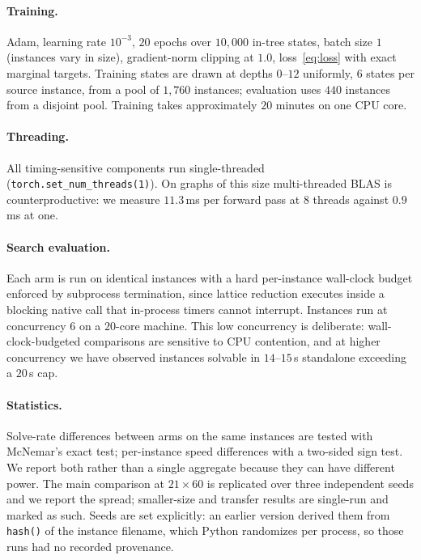 \documentclass[11pt]{article}
\begin{document}
\paragraph{Training.} Adam, learning rate $10^{-3}$, $20$ epochs over $10{,}000$ in-tree states, batch size $1$ (instances vary in size), gradient-norm clipping at $1.0$, loss~\eqref{eq:loss} with exact marginal targets. Training states are drawn at depths $0$--$12$ uniformly, $6$ states per source instance, from a pool of $1{,}760$ instances; evaluation uses $440$ instances from a disjoint pool. Training takes approximately $20$ minutes on one CPU core.

\paragraph{Threading.} All timing-sensitive components run single-threaded (\texttt{torch.set\_num\_threads(1)}). On graphs of this size multi-threaded BLAS is counterproductive: we measure $11.3$\,ms per forward pass at $8$ threads against $0.9$\,ms at one.

\paragraph{Search evaluation.} Each arm is run on identical instances with a hard per-instance wall-clock budget enforced by subprocess termination, since lattice reduction executes inside a blocking native call that in-process timers cannot interrupt. Instances run at concurrency $6$ on a $20$-core machine. This low concurrency is deliberate: wall-clock-budgeted comparisons are sensitive to CPU contention, and at higher concurrency we have observed instances solvable in $14$--$15$\,s standalone exceeding a $20$\,s cap.

\paragraph{Statistics.} Solve-rate differences between arms on the same instances are tested with McNemar's exact test; per-instance speed differences with a two-sided sign test. We report both rather than a single aggregate because they can have different power. The main comparison at $21\times60$ is replicated over three independent seeds and we report the spread; smaller-size and transfer results are single-run and marked as such. Seeds are set explicitly: an earlier version derived them from \texttt{hash()} of the instance filename, which Python randomizes per process, so those runs had no recorded provenance.
\end{document}
